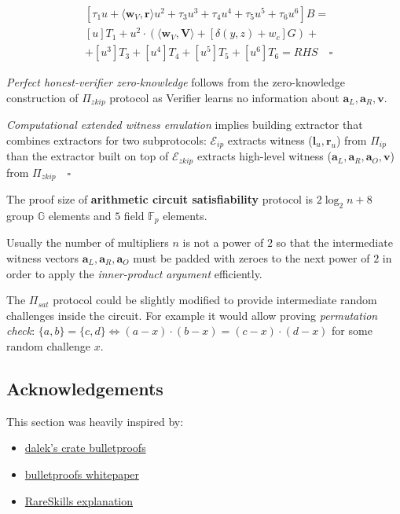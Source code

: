 \documentclass[../../book.tex]{subfiles}
\begin{document}
\begin{itemize}
\begin{equation*}
\begin{aligned}
            & [\tau_1 u + \langle \mathbf{w}_V, \mathbf{r} \rangle u^2 + \tau_3 u^3 + \tau_4 u^4 + \tau_5 u^5 + \tau_6 u^6]B = \\
            & [u]T_1 + u^2 \cdot (\langle \mathbf{w}_V, \mathbf{V} \rangle + [\delta(y,z) + w_c]G) +\\
            &+ [u^3]T_3 + [u^4]T_4 + [u^5]T_5 + [u^6]T_6 = RHS \quad \square
        \end{aligned}
    \end{equation*}
\end{itemize}

\textit{Perfect honest-verifier zero-knowledge} follows from the zero-knowledge construction of $\Pi_{zkip}$ protocol as Verifier learns no information about $\mathbf{a}_L, \mathbf{a}_R, \mathbf{v}$.

\textit{Computational extended witness emulation} implies building extractor that combines extractors for two subprotocols: $\mathcal{E}_{ip}$ extracts witness ($\mathbf{l}_u, \mathbf{r}_u$) from $\Pi_{ip}$ than the extractor built on top of $\mathcal{E}_{zkip}$ extracts high-level witness ($\mathbf{a}_L, \mathbf{a}_R, \mathbf{a}_O, \mathbf{v}$) from $\Pi_{zkip} \quad \square$

The proof size of \textbf{arithmetic circuit satisfiability} protocol is $2 \log_2n +8$ group $\mathbb{G}$ elements and $5$ field $\mathbb{F}_p$ elements.

Usually the number of multipliers $n$ is not a power of $2$ so that the intermediate witness vectors $\mathbf{a}_L, \mathbf{a}_R, \mathbf{a}_O$ must be padded with zeroes to the next power of $2$ in order to apply the \textit{inner-product argument} efficiently. 
\begin{remark}
    The $\Pi_{sat}$ protocol could be slightly modified to provide intermediate random challenges inside the circuit. For example it would allow proving \textit{permutation check}: $\{a,b\} = \{c,d\}  \iff (a-x)\cdot(b-x) = (c-x)\cdot(d-x)$ for some random challenge $x$.
\end{remark}
\subsection*{Acknowledgements}
This section was heavily inspired by:
\begin{itemize}
    \item \href{https://doc-internal.dalek.rs/bulletproofs/index.html}{dalek's crate bulletproofs}
    \item \href{https://eprint.iacr.org/2017/1066.pdf}{bulletproofs whitepaper}
    \item \href{https://rareskills.io/post/zk-multiplication}{RareSkills explanation}
\end{itemize}
\end{document}

